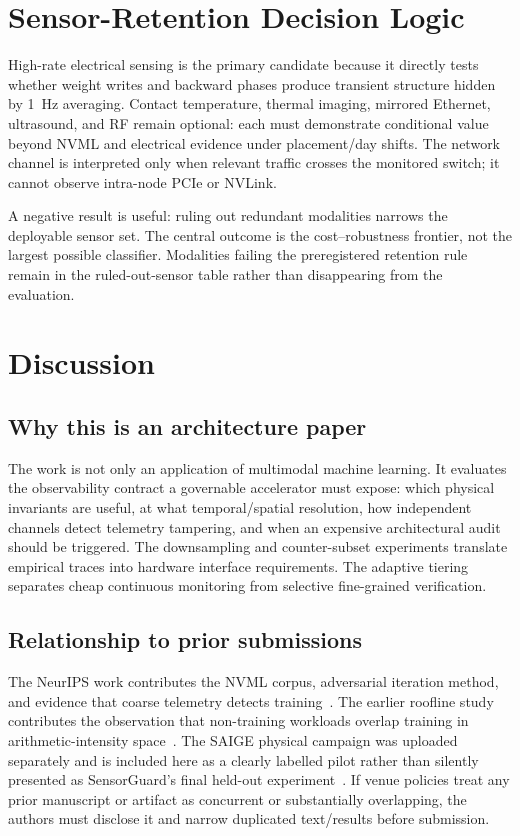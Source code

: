 \documentclass[sigplan,anonymous,review,nonacm]{acmart}
\begin{document}
\section{Sensor-Retention Decision Logic}

High-rate electrical sensing is the primary candidate because it directly tests whether weight writes and backward phases produce transient structure hidden by 1~Hz averaging. Contact temperature, thermal imaging, mirrored Ethernet, ultrasound, and RF remain optional: each must demonstrate conditional value beyond NVML and electrical evidence under placement/day shifts. The network channel is interpreted only when relevant traffic crosses the monitored switch; it cannot observe intra-node PCIe or NVLink.

A negative result is useful: ruling out redundant modalities narrows the deployable sensor set. The central outcome is the cost--robustness frontier, not the largest possible classifier. Modalities failing the preregistered retention rule remain in the ruled-out-sensor table rather than disappearing from the evaluation.

\section{Discussion}

\subsection{Why this is an architecture paper}

The work is not only an application of multimodal machine learning. It evaluates the observability contract a governable accelerator must expose: which physical invariants are useful, at what temporal/spatial resolution, how independent channels detect telemetry tampering, and when an expensive architectural audit should be triggered. The downsampling and counter-subset experiments translate empirical traces into hardware interface requirements. The adaptive tiering separates cheap continuous monitoring from selective fine-grained verification.

\subsection{Relationship to prior submissions}

The NeurIPS work contributes the NVML corpus, adversarial iteration method, and evidence that coarse telemetry detects training~\cite{rahman2026hidden}. The earlier roofline study contributes the observation that non-training workloads overlap training in arithmetic-intensity space~\cite{anonymous2026always}. The SAIGE physical campaign was uploaded separately and is included here as a clearly labelled pilot rather than silently presented as SensorGuard's final held-out experiment~\cite{rahman2026physical}. If venue policies treat any prior manuscript or artifact as concurrent or substantially overlapping, the authors must disclose it and narrow duplicated text/results before submission.
\end{document}
